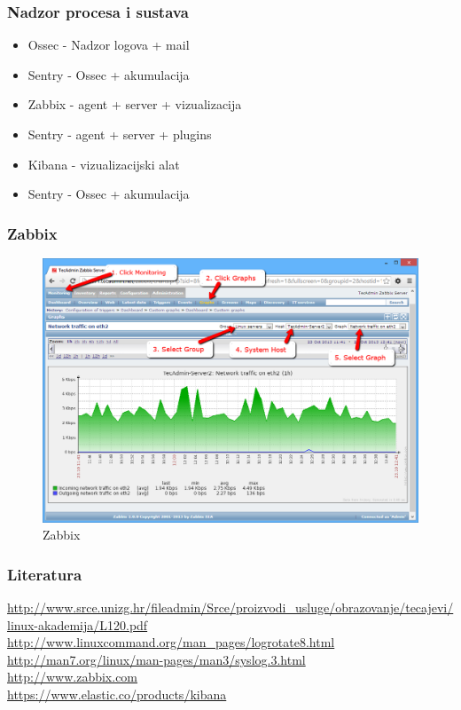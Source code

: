 \documentclass[t,table,usenames,dvipsnames]{beamer}
\begin{document}
\begin{frame}
	\frametitle{Nadzor procesa i sustava}
	
	\begin{itemize}
		\item Ossec - Nadzor logova + mail
		\item Sentry - Ossec + akumulacija
		\item Zabbix - agent + server + vizualizacija
		\item Sentry - agent + server + plugins
		\item Kibana - vizualizacijski alat
		\item Sentry - Ossec + akumulacija
	\end{itemize}
	
\end{frame}

\begin{frame}
	\frametitle{Zabbix}
	\begin{figure}
		\centering
		\includegraphics[width=0.7\linewidth]{graph-network}
		\caption{Zabbix}
		\label{fig:graph-network}
	\end{figure}
	
\end{frame}


\begin{frame}
	\frametitle{Literatura}
	\url{http://www.srce.unizg.hr/fileadmin/Srce/proizvodi_usluge/obrazovanje/tecajevi/linux-akademija/L120.pdf}
	\vfill
	\url{http://www.linuxcommand.org/man_pages/logrotate8.html}\\
	\url{http://man7.org/linux/man-pages/man3/syslog.3.html}\\
	\vfill
	\url{http://www.zabbix.com}\\
	\vfill
	\url{https://www.elastic.co/products/kibana}\\
\end{frame}
\end{document}

